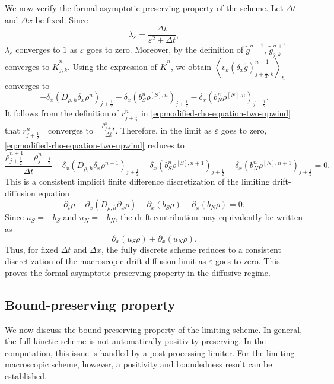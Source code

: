 \documentclass[11pt,twoside]{article}
\numberwithin{equation}{section}
\theoremstyle{plain}
\theoremstyle{nonumberplain}
\begin{document}
{We now verify the formal asymptotic preserving property of the scheme.
Let \(\Delta t\) and \(\Delta x\) be fixed. Since
\[
\lambda_\varepsilon
=
\frac{\Delta t}{\varepsilon^2+\Delta t},
\]
\(\lambda_\varepsilon\) converges to \(1\) as \(\varepsilon\) goes to zero.
Moreover, by the definition of \(\widetilde g^{n+1}\),
\(\widetilde g_{j,k}^{n+1}\) converges to \(\widetilde K_{j,k}^{n}\).
Using the expression of \(\widetilde K^n\), we obtain \(\left\langle
v_k(\delta_x\widetilde g)_{j+\frac12,k}^{n+1}
\right\rangle_h\) converges to
\[
-\delta_x\left(D_{\rho,h}\delta_x\rho^n\right)_{j+\frac12}
-
\delta_x\left(b_S^n\rho^{[S],n}\right)_{j+\frac12}
-
\delta_x\left(b_N^n\rho^{[N],n}\right)_{j+\frac12}.
\]
It follows from the definition of \(r_{j+\frac12}^n\) in
\eqref{eq:modified-rho-equation-two-upwind} that
\(
r_{j+\frac12}^n
\quad\text{converges to}\quad
\frac{\rho_{j+\frac12}^n}{\Delta t}.
\)
Therefore, in the limit as \(\varepsilon\) goes to zero,
\eqref{eq:modified-rho-equation-two-upwind} reduces to
\begin{equation}\label{eq:limiting-density-scheme}
\frac{\rho_{j+\frac12}^{n+1}-\rho_{j+\frac12}^{n}}{\Delta t}
-
\delta_x\left(
D_{\rho,h}\delta_x\rho^{n+1}
\right)_{j+\frac12}
-
\delta_x\left(
b_S^n\rho^{[S],n+1}
\right)_{j+\frac12}
-
\delta_x\left(
b_N^n\rho^{[N],n+1}
\right)_{j+\frac12}
=0 .
\end{equation}
This is a consistent implicit finite difference discretization of the
limiting drift-diffusion equation
\[
\partial_t\rho
-
\partial_x\left(D_{\rho,h}\partial_x\rho\right)
-
\partial_x\left(b_S\rho\right)
-
\partial_x\left(b_N\rho\right)
=0 .
\]
Since \(u_S=-b_S\) and \(u_N=-b_N\), the drift contribution may equivalently
be written as
\[
\partial_x(u_S\rho)+\partial_x(u_N\rho).
\]
Thus, for fixed \(\Delta t\) and \(\Delta x\), the fully discrete scheme
reduces to a consistent discretization of the macroscopic drift-diffusion
limit as \(\varepsilon\) goes to zero. This proves the formal asymptotic
preserving property in the diffusive regime.

\subsection{Bound-preserving property}

We now discuss the bound-preserving property of the limiting scheme.
In general, the full kinetic scheme is not automatically positivity
preserving. In the computation, this issue is handled by a post-processing
limiter. For the limiting macroscopic scheme, however, a positivity and
boundedness result can be established.

}
\end{document}
